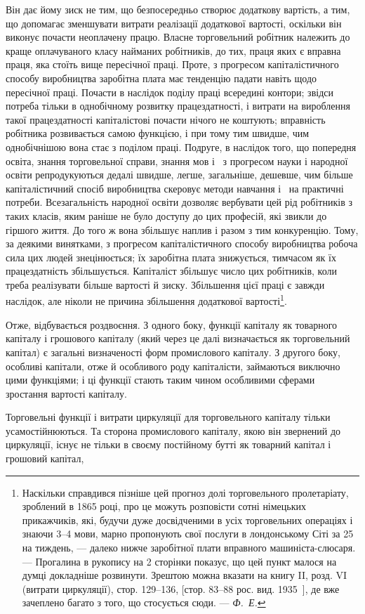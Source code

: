 \parcont{}  %
Він дає йому зиск не тим, що безпосередньо створює додаткову
вартість, а тим, що допомагає зменшувати витрати реалізації додаткової
вартості, оскільки він виконує почасти неоплачену працю.
Власне торговельний робітник належить до краще оплачуваного
класу найманих робітників, до тих, праця яких є вправна праця,
яка стоїть вище пересічної праці. Проте, з прогресом капіталістичного
способу виробництва заробітна плата має тенденцію
падати навіть щодо пересічної праці. Почасти в наслідок поділу
праці всередині контори; звідси потреба тільки в однобічному
розвитку працездатності, і витрати на вироблення такої працездатності
капіталістові почасти нічого не коштують; вправність
робітника розвивається самою функцією, і при тому тим швидше,
чим однобічнішою вона стає з поділом праці. Подруге, в наслідок
того, що попередня освіта, знання торговельної справи,
знання мов і~ з прогресом науки і народної освіти репродукуються
дедалі швидше, легше, загальніше, дешевше, чим
більше капіталістичний спосіб виробництва скеровує методи
навчання і~ на практичні потреби. Всезагальність народної
освіти дозволяє вербувати цей рід робітників з таких класів,
яким раніше не було доступу до цих професій, які звикли до
гіршого життя. До того ж вона збільшує наплив і разом з тим
конкуренцію. Тому, за деякими винятками, з прогресом капіталістичного
способу виробництва робоча сила цих людей знецінюється;
їх заробітна плата знижується, тимчасом як їх
працездатність збільшується. Капіталіст збільшує число цих
робітників, коли треба реалізувати більше вартості й зиску.
Збільшення цієї праці є завжди наслідок, але ніколи не причина
збільшення додаткової вартості\footnote{
Наскільки справдився пізніше цей прогноз долі торговельного пролетаріату,
зроблений в 1865 році, про це можуть розповісти сотні німецьких
прикажчиків, які, будучи дуже досвідченими в усіх торговельних операціях
і знаючи 3--4 мови, марно пропонують свої послуги в лондонському Сіті за
25 на тиждень, — далеко нижче заробітної плати вправного машиніста-слюсаря. — Прогалина в
рукопису на 2 сторінки показує, що цей пункт
малося на думці докладніше розвинути. Зрештою можна вказати на книгу II,
розд. VI (витрати циркуляції), стор. 129--136, [стор. 83--88 рос. вид. 1935~],
де вже зачеплено багато з того, що стосується сюди. — \emph{Ф.~Е.}
}.

Отже, відбувається роздвоєння. З одного боку, функції капіталу
як товарного капіталу і грошового капіталу (який через
це далі визначається як торговельний капітал) є загальні визначеності
форм промислового капіталу. З другого боку, особливі
капітали, отже й особливого роду капіталісти, займаються виключно
цими функціями; і ці функції стають таким чином особливими
сферами зростання вартості капіталу.

Торговельні функції і витрати циркуляції для торговельного
капіталу тільки усамостійнюються. Та сторона промислового капіталу,
якою він звернений до циркуляції, існує не тільки в своєму
постійному бутті як товарний капітал і грошовий капітал,
\parbreak{}  %
